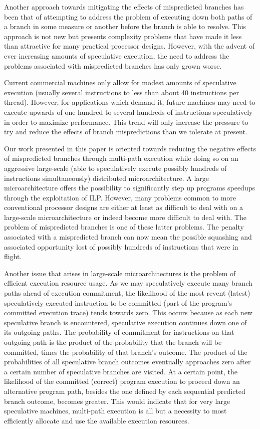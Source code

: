 \documentclass[10pt,dvips]{article}
\begin{document}
Another approach towards mitigating the effects of mispredicted branches
has been that of attempting to address the problem of executing
down both paths of a branch in some measure or another before the
branch is able to resolve.  This approach is not new but presents
complexity problems that have made it less than attractive for
many practical processor designs.  However, with the advent of ever
increasing amounts of speculative execution, the need to address
the problems associated with mispredicted branches has only grown worse.

Current commercial machines only allow for modest
amounts of speculative execution (usually several instructions to 
less than about 40 instructions per thread).
However, for applications which demand it,
future machines may need to execute upwards of one hundred to
several hundreds of instructions speculatively in order to maximize
performance.  This trend will only increase the pressure to try
and reduce the effects of branch mispredictions than we tolerate
at present.

Our work presented in this paper is oriented towards reducing the
negative effects of mispredicted branches through multi-path execution
while doing so on an aggressive large-scale (able to speculatively execute
possibly hundreds of instructions simultaneously)
distributed
microarchitecture.  
A large microarchitecture offers the
possibility to significantly step up programs speedups through 
the exploitation of ILP.
However, many problems common to more conventional processor designs
are either at least as difficult to deal with on a large-scale
microarchitecture or indeed become more difficult to deal with.
The problem of mispredicted branches is one of these latter problems.
The penalty associated with a mispredicted branch can now mean
the possible squashing and associated opportunity lost of possibly
hundreds of instructions that were in flight.  

Another issue that arises in large-scale microarchitectures is the
problem of efficient execution resource usage.
As we may speculatively execute many branch paths ahead of execution
commitment, the likelihood
of the most revent (latest) speculatively executed instruction to
be committed (part of the program's committed execution trace) tends
towards zero.  This occurs because as each new speculative branch is
encountered, speculative execution continues down one of its
outgoing paths.  The probability of commitment for instructions on 
that outgoing
path is the product of the probability that
the branch will be committed, times the probability of that branch's outcome.
The product of the probabilities of all speculative branch outcomes
eventually approaches zero after a certain
number of speculative branches are visited. 
At a certain point, the likelihood of the committed (correct)
program execution to proceed down an alternative program path,
besides the one defined by each sequential predicted branch outcome,
becomes greater.  This would indicate that for very large speculative
machines, multi-path execution is all but a necessity to most
efficiently allocate and use the available execution resources.
\end{document}

